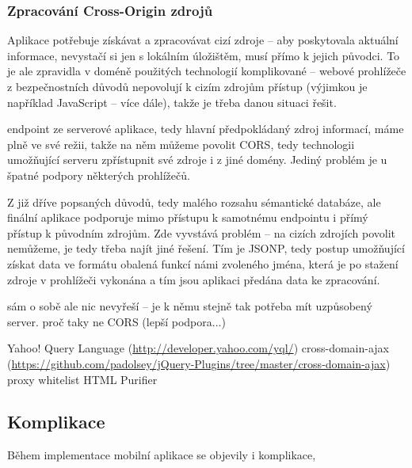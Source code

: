 
\subsubsection{Zpracování Cross-Origin zdrojů}
\label{sec:mobil:cross-origin}
Aplikace potřebuje získávat a zpracovávat cizí zdroje -- aby poskytovala aktuální informace, nevystačí si jen s lokálním úložištěm, musí přímo k jejich původci. To je ale zpravidla v doméně použitých technologií komplikované -- webové prohlížeče z bezpečnostních důvodů nepovolují k cizím zdrojům přístup (výjimkou je například JavaScript -- více dále), takže je třeba danou situaci řešit.

 endpoint ze serverové aplikace, tedy hlavní předpokládaný zdroj informací, máme plně ve své režii, takže na něm můžeme povolit \gls{CORS}, tedy technologii umožňující serveru zpřístupnit své zdroje i z jiné domény. Jediný problém je u špatné podpory některých prohlížečů.

Z již dříve popsaných důvodů, tedy malého rozsahu sémantické databáze, ale finální aplikace podporuje mimo přístupu k samotnému  endpointu i přímý přístup k původním zdrojům. Zde vyvstává problém -- na cizích zdrojích  povolit nemůžeme, je tedy třeba najít jiné řešení. Tím je \gls{JSONP}, tedy postup umožňující získat data ve formátu  obalená funkcí námi zvoleného jména, která je po stažení zdroje v prohlížeči vykonána a tím jsou aplikaci předána data ke zpracování.

 sám o sobě ale nic nevyřeší -- je k němu stejně tak potřeba mít uzpůsobený server.   proč taky ne CORS (lepší podpora...)

Yahoo! Query Language (\url{http://developer.yahoo.com/yql/})
cross-domain-ajax (\url{https://github.com/padolsey/jQuery-Plugins/tree/master/cross-domain-ajax})
proxy
whitelist
HTML Purifier


\subsection{Komplikace}
Během implementace mobilní aplikace se objevily i komplikace, 


